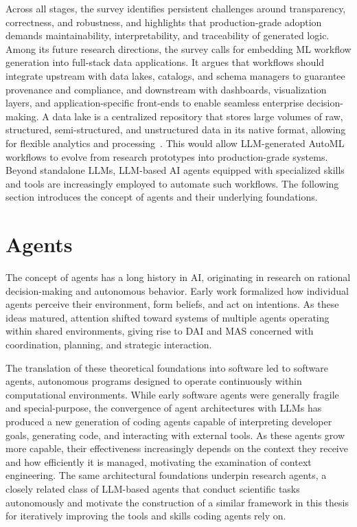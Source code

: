 \documentclass[
english,                 %
bibtex,                  %
includeExtraAbstracts, %
]{kththesis}
\numberwithin{listing}{chapter}
\begin{document}
Across all stages, the survey identifies persistent challenges around transparency, correctness, and robustness, and highlights that production-grade adoption demands maintainability, interpretability, and traceability of generated logic. Among its future research directions, the survey calls for embedding \gls{ML} workflow generation into full-stack data applications. It argues that workflows should integrate upstream with data lakes, catalogs, and schema managers to guarantee provenance and compliance, and downstream with dashboards, visualization layers, and application-specific front-ends to enable seamless enterprise decision-making. A data lake is a centralized repository that stores large volumes of raw, structured, semi-structured, and unstructured data in its native format, allowing for flexible analytics and processing~\cite{hai_data_2023}. This would allow \gls{LLM}-generated \gls{AutoML} workflows to evolve from research prototypes into production-grade systems. Beyond standalone \glspl{LLM}, \gls{LLM}-based \gls{AI} agents equipped with specialized skills and tools are increasingly employed to automate such workflows. The following section introduces the concept of agents and their underlying foundations.

\section{Agents}
\glsresetall

The concept of agents has a long history in \gls{AI}, originating in research on rational decision-making and autonomous behavior. Early work formalized how individual agents perceive their environment, form beliefs, and act on intentions. As these ideas matured, attention shifted toward systems of multiple agents operating within shared environments, giving rise to \gls{DAI} and \gls{MAS} concerned with coordination, planning, and strategic interaction.

The translation of these theoretical foundations into software led to software agents, autonomous programs designed to operate continuously within computational environments. While early software agents were generally fragile and special-purpose, the convergence of agent architectures with \glspl{LLM} has produced a new generation of coding agents capable of interpreting developer goals, generating code, and interacting with external tools. As these agents grow more capable, their effectiveness increasingly depends on the context they receive and how efficiently it is managed, motivating the examination of context engineering. The same architectural foundations underpin research agents, a closely related class of \gls{LLM}-based agents that conduct scientific tasks autonomously and motivate the construction of a similar framework in this thesis for iteratively improving the tools and skills coding agents rely on.
\end{document}
